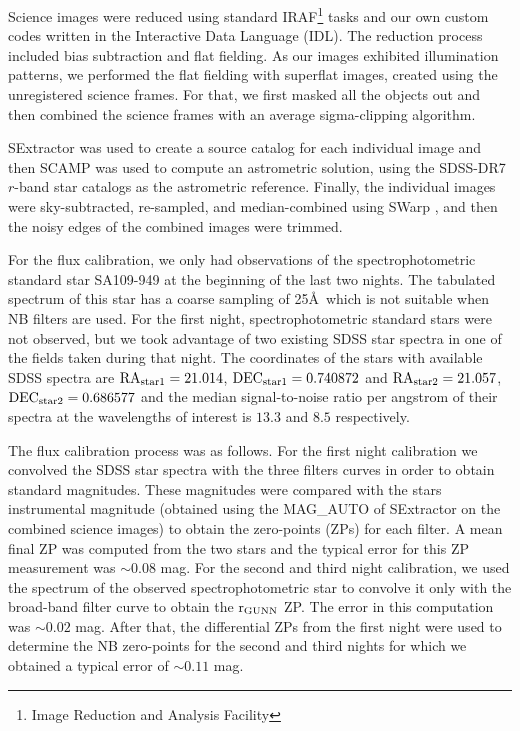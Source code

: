 \documentclass[iop, revtex4]{emulateapj}
\begin{document}
Science images were reduced using standard IRAF\footnote{Image
  Reduction and Analysis Facility} tasks and our own custom codes
written in the Interactive Data Language (IDL).
The reduction process included bias subtraction and flat
fielding. As our images exhibited illumination patterns, we performed
the flat fielding with superflat images,
created using the unregistered science frames. For that, we first
masked all the objects out and then combined the science frames with
an average sigma-clipping algorithm.

SExtractor \citep{Bertin96} was used to create a source catalog for each individual image and then SCAMP \citep{Bertin06} was used to compute an astrometric solution,  
using the SDSS-DR7 $r$-band star catalogs as the astrometric reference.
Finally, the individual images were sky-subtracted, re-sampled, and median-combined using SWarp \citep{Bertin02}, and then the noisy edges of the combined images were trimmed.

For the flux calibration, we only had observations of the
spectrophotometric standard star SA109-949 at the beginning of the
last two nights. The tabulated spectrum of this star has a coarse
sampling of 25\AA\,\citep{Stone96} which is not suitable when NB
 filters are used. For the first night, spectrophotometric
standard stars were not observed, but we took advantage of two
existing SDSS star spectra in one of the fields taken during that
night. The coordinates of the stars with available SDSS spectra are
$\rm RA_{star1}=21.014$, $\rm DEC_{star1}=0.740872$ and $\rm
RA_{star2}=21.057$, $\rm DEC_{star2}=0.686577$ and the median
signal-to-noise ratio per angstrom of their spectra at the wavelengths of interest
is $13.3$ and $8.5$ respectively.

The flux calibration process was as follows. For the first night
calibration we convolved the SDSS star spectra with the three filters
curves in order to obtain standard magnitudes. These magnitudes were
compared with the stars instrumental magnitude (obtained using the
MAG\_AUTO of SExtractor on the combined science images) to obtain the
zero-points (ZPs) for each filter. A mean final ZP was computed from
the two stars and the typical error for this ZP measurement was $\sim0.08$
mag.
For the second and third night calibration, we used the spectrum
of the observed spectrophotometric star to convolve it only with the
broad-band filter curve to obtain the $\rm r_{GUNN}$ ZP. The error in this computation was 
$\sim0.02$ mag. 
After that,
the differential ZPs from the first night were used to determine the
NB zero-points for the second and third nights for which we obtained 
a typical error of $\sim0.11$ mag.
\end{document}
